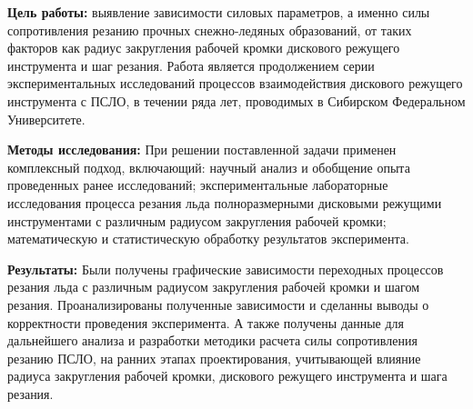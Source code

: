 \textbf{Цель работы:} выявление зависимости силовых параметров, а именно силы сопротивления резанию прочных снежно-ледяных образований, от таких факторов как радиус закругления рабочей кромки дискового режущего инструмента и шаг резания. Работа является продолжением серии экспериментальных исследований процессов взаимодействия дискового режущего инструмента с ПСЛО, в течении ряда лет, проводимых в Сибирском Федеральном Университете.

\textbf{Методы исследования:} При решении поставленной задачи применен комплексный подход, включающий: научный анализ и обобщение опыта проведенных ранее исследований; экспериментальные лабораторные исследования процесса резания льда полноразмерными дисковыми режущими инструментами с различным радиусом закругления рабочей кромки; математическую и статистическую обработку результатов эксперимента.

\textbf{Результаты:} Были получены графические зависимости переходных процессов резания льда с различным радиусом закругления рабочей кромки и шагом резания. Проанализированы полученные зависимости и сделанны выводы о корректности проведения эксперимента. А также получены данные для дальнейшего анализа и разработки методики расчета силы сопротивления резанию ПСЛО, на ранних этапах проектирования, учитывающей влияние радиуса закругления рабочей кромки, дискового режущего инструмента и шага резания.
